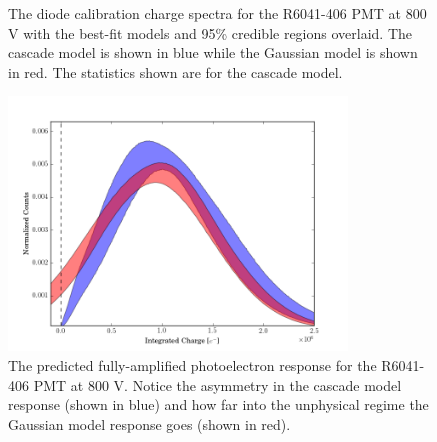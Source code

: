 \begin{figure}[t]
        \centering
        
         \hfill
        
        
        \caption{The diode calibration charge spectra for the R6041-406 PMT at 800 V with the best-fit models and 95\% credible regions overlaid.  The cascade model is shown in blue while the Gaussian model is shown in red.  The statistics shown are for the cascade model.}
    
        \label{fig:nerix_best_fits}
\end{figure}



\begin{figure}[t]
\centering
\includegraphics[width=9cm]{nerix_spe_response.png}
\caption{The predicted fully-amplified photoelectron response for the R6041-406 PMT at 800 V.  Notice the asymmetry in the cascade model response (shown in blue) and how far into the unphysical regime the Gaussian model response goes (shown in red). }
\label{fig:fig-nerix_spe}
\end{figure}


